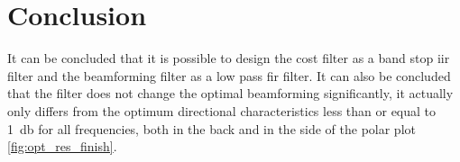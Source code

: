 \section{Conclusion}
It can be concluded that it is possible to design the cost filter as a band stop \gls{iir} filter and the beamforming filter as a low pass \gls{fir} filter. It can also be concluded that the filter does not change the optimal beamforming significantly, it actually only differs from the optimum directional characteristics less than or equal to \SI{1}{\decibel} for all frequencies, both in the back and in the side of the polar plot \autoref{fig:opt_res_finish}.





